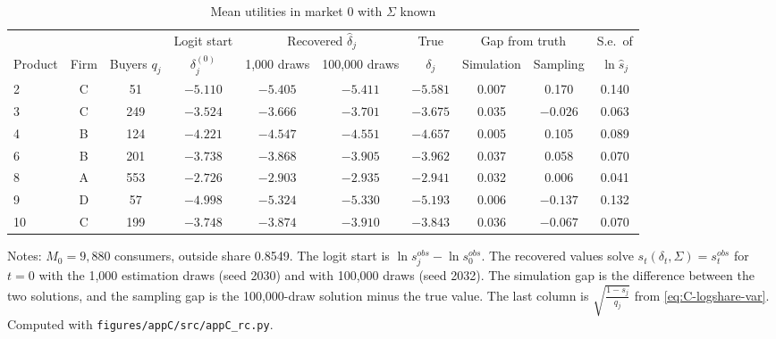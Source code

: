 \begin{table}[htbp]
\centering
\caption{Mean utilities in market 0 with $\Sigma$ known}
\label{tab:C-delta0}
\footnotesize
\setlength{\tabcolsep}{4.5pt}
\begin{tabular}{@{}lccccccccc@{}}
\toprule
 & & & Logit start & \multicolumn{2}{c}{Recovered $\hat\delta_j$} & True & \multicolumn{2}{c}{Gap from truth} & S.e.\ of \\
\cmidrule(lr){5-6}\cmidrule(lr){8-9}
Product & Firm & Buyers $q_j$ & $\delta^{(0)}_j$ & 1,000 draws & 100,000 draws & $\delta_j$ & Simulation & Sampling &
$\ln\hat s_j$ \\
\midrule
2 & C & 51 & $-5.110$ & $-5.405$ & $-5.411$ & $-5.581$ & 0.007 & 0.170 & 0.140 \\
3 & C & 249 & $-3.524$ & $-3.666$ & $-3.701$ & $-3.675$ & 0.035 & $-0.026$ & 0.063 \\
4 & B & 124 & $-4.221$ & $-4.547$ & $-4.551$ & $-4.657$ & 0.005 & 0.105 & 0.089 \\
6 & B & 201 & $-3.738$ & $-3.868$ & $-3.905$ & $-3.962$ & 0.037 & 0.058 & 0.070 \\
8 & A & 553 & $-2.726$ & $-2.903$ & $-2.935$ & $-2.941$ & 0.032 & 0.006 & 0.041 \\
9 & D & 57 & $-4.998$ & $-5.324$ & $-5.330$ & $-5.193$ & 0.006 & $-0.137$ & 0.132 \\
10 & C & 199 & $-3.748$ & $-3.874$ & $-3.910$ & $-3.843$ & 0.036 & $-0.067$ & 0.070 \\
\bottomrule
\end{tabular}

\vspace{3pt}
\begin{minipage}{0.97\textwidth}
\footnotesize Notes: $M_0 = 9{,}880$ consumers, outside share 0.8549. The logit start is
$\ln s^{obs}_j - \ln s^{obs}_0$. The recovered values solve $s_t(\delta_t, \Sigma) = s^{obs}_t$ for $t = 0$
with the 1,000 estimation draws (seed 2030) and with 100,000 draws (seed 2032). The simulation gap is the difference between the two
solutions, and the sampling gap is the 100,000-draw solution minus the true value. The last column is
$\sqrt{\frac{1 - s_j}{q_j}}$ from \eqref{eq:C-logshare-var}. Computed with \texttt{figures/appC/src/appC\_rc.py}.
\end{minipage}
\end{table}

